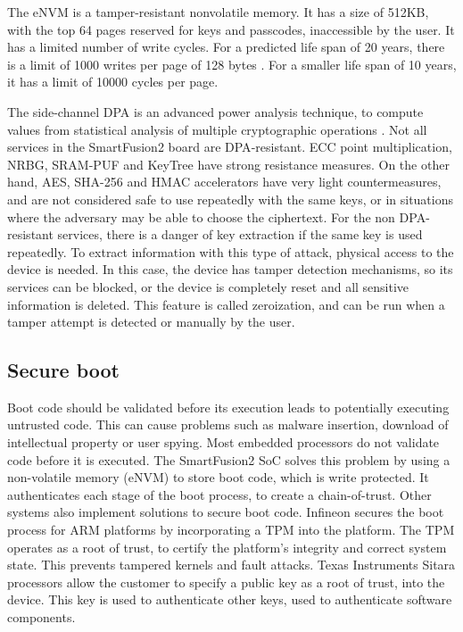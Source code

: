 The eNVM is a tamper-resistant nonvolatile memory. It has a size of 512KB, with the top 64 pages reserved for keys and passcodes, inaccessible by the user.
It has a limited number of write cycles. For a predicted life span of 20 years, there is a limit of 1000 writes per page of 128 bytes \cite{smartfusionDatasheet}. For a smaller life span of 10 years, it has a limit of 10000 cycles per page.

The side-channel \ac{DPA} is an advanced power analysis technique, to compute values from statistical analysis of multiple cryptographic operations \cite{kocher1999differential}.
Not all services in the SmartFusion2 board are \ac{DPA}-resistant. ECC point multiplication, \ac{NRBG}, SRAM-PUF and KeyTree have strong resistance measures.
On the other hand, AES, SHA-256 and HMAC accelerators have very light countermeasures, and are not considered safe to use repeatedly with the same keys, or in situations where the adversary may be able to choose the ciphertext.
For the non \ac{DPA}-resistant services, there is a danger of key extraction if the same key is used repeatedly.
To extract information with this type of attack, physical access to the device is needed. In this case, the device has tamper detection mechanisms, so its services can be blocked, or the device is completely reset and all sensitive information is deleted.
This feature is called zeroization, and can be run when a tamper attempt is detected or manually by the user.

\subsection*{Secure boot}

Boot code should be validated before its execution leads to potentially executing untrusted code. This can cause problems such as malware insertion, download of intellectual property or user spying.
Most embedded processors do not validate code before it is executed. The SmartFusion2 \ac{SoC} solves this problem by using a non-volatile memory (eNVM) to store boot code, which is write protected. It authenticates each stage of the boot process, to create a chain-of-trust.
Other systems also implement solutions to secure boot code. Infineon secures the boot process for ARM platforms by incorporating a \ac{TPM} into the platform. The \ac{TPM} operates as a root of trust, to certify the platform's integrity and correct system state. This prevents tampered kernels and fault attacks.
Texas Instruments Sitara processors allow the customer to specify a public key as a root of trust, into the device. This key is used to authenticate other keys, used to authenticate software components.

